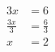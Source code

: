 \documentclass[varwidth]{standalone}
\begin{document}
    \begin{varwidth}{0.25\paperwidth}
    \begin{align*}
    3x &= 6\\
    \frac{3x}{3} &= \frac{6}{3}\\
    x &= 2\\
\end{align*}
\end{varwidth}
\end{document}
